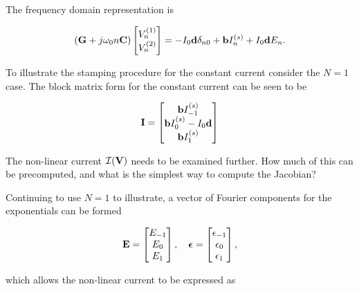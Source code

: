 The frequency domain representation is

\begin{equation}\label{eqn:ece1254projectReport:820}
\lr{ \BG + j \omega_0 n \BC }
\begin{bmatrix}
V^{(1)}_n \\
V^{(2)}_n \\
\end{bmatrix}
=
-I_0 \Bd \delta_{n 0}
+
\Bb I^{(s)}_n
+ I_0 \Bd E_n.
\end{equation}

To illustrate the stamping procedure for the constant current consider the \( N = 1 \) case.
The block matrix form for the constant current can be seen to be

\begin{equation}\label{eqn:ece1254projectReport:840}
\BI
=
\begin{bmatrix}
\Bb I^{(s)}_{-1} \\
\Bb I^{(s)}_{0} - I_0 \Bd \\
\Bb I^{(s)}_{1} \\
\end{bmatrix}
\end{equation}

The non-linear current \( \mathcal{I}(\mathbf{V}) \) needs to be examined further.
How much of this can be precomputed, and what is the simplest way to compute the Jacobian?

Continuing to use \( N = 1 \) to illustrate, a vector of Fourier components for the exponentials can be formed

\begin{equation}\label{eqn:ece1254projectReport:880}
\BE =
\begin{bmatrix}
E_{-1} \\
E_{0} \\
E_{1} \\
\end{bmatrix}, \quad
\Bepsilon =
\begin{bmatrix}
\epsilon_{-1} \\
\epsilon_{0} \\
\epsilon_{1} \\
\end{bmatrix},
\end{equation}

which allows the non-linear current to be expressed as

